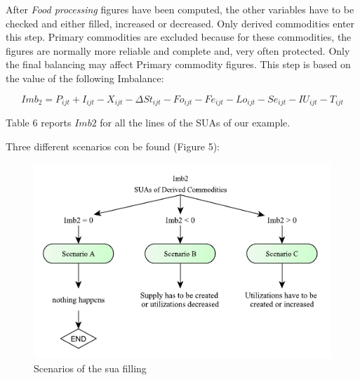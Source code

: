 \documentclass[]{article}
\begin{document}
After \emph{Food processing} figures have been computed, the other
variables have to be checked and either filled, increased or decreased.
Only derived commodities enter this step. Primary commodities are
excluded because for these commodities, the figures are normally more
reliable and complete and, very often protected. Only the final
balancing may affect Primary commodity figures. This step is based on
the value of the following Imbalance:

\begin{equation}
\label{eq:imbalance2}
Imb_{2} = P_{ijt} + I_{ijt} - X_{ijt} - \Delta St_{ijt} - Fo_{ijt} - Fe_{ijt} - Lo_{ijt} - Se_{ijt} - IU_{ijt} - T_{ijt}
\end{equation}

Table 6 reports \(Imb2\) for all the lines of the SUAs of our example.

Three different scenarios con be found (Figure 5):

\begin{figure}

{\centering \includegraphics[width=0.8\linewidth]{images/05_ScenariosFilling} 

}

\caption{\label{fig:f5}Scenarios of the sua filling}\label{fig:f5}
\end{figure}
\end{document}
